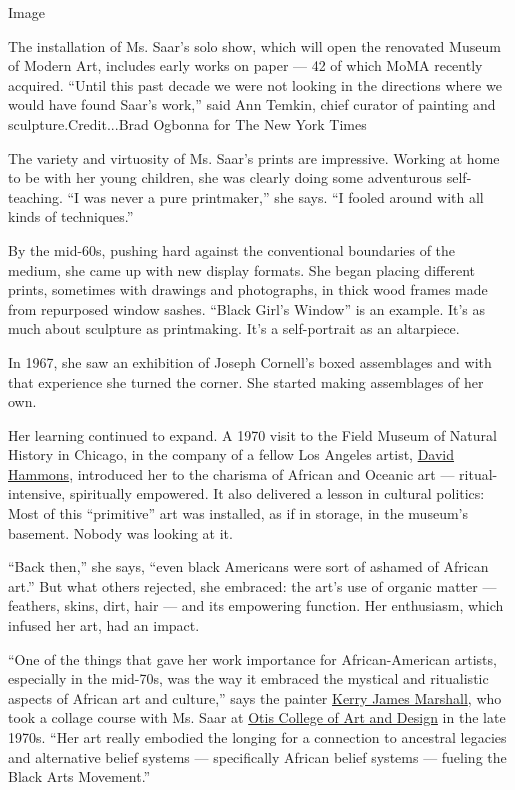 Image

The installation of Ms. Saar's solo show, which will open the renovated
Museum of Modern Art, includes early works on paper --- 42 of which MoMA
recently acquired. ``Until this past decade we were not looking in the
directions where we would have found Saar's work,'' said Ann Temkin,
chief curator of painting and sculpture.Credit...Brad Ogbonna for The
New York Times

The variety and virtuosity of Ms. Saar's prints are impressive. Working
at home to be with her young children, she was clearly doing some
adventurous self-teaching. ``I was never a pure printmaker,'' she says.
``I fooled around with all kinds of techniques.''

By the mid-60s, pushing hard against the conventional boundaries of the
medium, she came up with new display formats. She began placing
different prints, sometimes with drawings and photographs, in thick wood
frames made from repurposed window sashes. ``Black Girl's Window'' is an
example. It's as much about sculpture as printmaking. It's a
self-portrait as an altarpiece.

In 1967, she saw an exhibition of Joseph Cornell's boxed assemblages and
with that experience she turned the corner. She started making
assemblages of her own.

Her learning continued to expand. A 1970 visit to the Field Museum of
Natural History in Chicago, in the company of a fellow Los Angeles
artist, \href{https://www.moma.org/artists/2486}{David Hammons},
introduced her to the charisma of African and Oceanic art ---
ritual-intensive, spiritually empowered. It also delivered a lesson in
cultural politics: Most of this ``primitive'' art was installed, as if
in storage, in the museum's basement. Nobody was looking at it.

``Back then,'' she says, ``even black Americans were sort of ashamed of
African art.'' But what others rejected, she embraced: the art's use of
organic matter --- feathers, skins, dirt, hair --- and its empowering
function. Her enthusiasm, which infused her art, had an impact.

``One of the things that gave her work importance for African-American
artists, especially in the mid-70s, was the way it embraced the mystical
and ritualistic aspects of African art and culture,'' says the painter
\href{https://www.jackshainman.com/artists/kerryjames-marshall/}{Kerry
James Marshall}, who took a collage course with Ms. Saar at
\href{https://www.otis.edu/}{Otis College of Art and Design} in the late
1970s. ``Her art really embodied the longing for a connection to
ancestral legacies and alternative belief systems --- specifically
African belief systems --- fueling the Black Arts Movement.''

